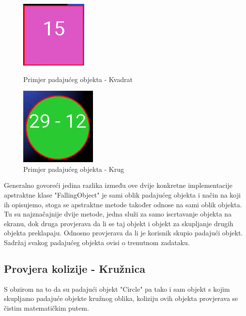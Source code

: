 \documentclass[times, utf8, zavrsni, numeric]{fer}
\begin{document}
	
		\begin{figure}[!htb]
			\begin{minipage}{0.48\textwidth}
				\centering
				\includegraphics[scale=0.6]{"slike/square.png"} 
				\caption{Primjer padajućeg objekta - Kvadrat}
				\label{fig:squre}
			\end{minipage}\hfill
			\begin{minipage}{0.48\textwidth}
				\centering
				\includegraphics[scale=0.6]{"slike/circle.png"} 
				\caption{Primjer padajućeg objekta - Krug}
				\label{fig:circle}
			\end{minipage}
		\end{figure}
		
		Generalno govoreći jedina razlika između ove dvije konkretne implementacije apstraktne klase "FallingObject" je sami oblik padajućeg objekta i način na koji ih opisujemo, stoga se apstraktne metode također odnose na sami oblik objekta.
		Tu su najznačajnije  dvije metode, jedna služi za samo iscrtavanje objekta na ekranu, dok druga provjerava da li se taj objekt i objekt za skupljanje drugih objekta preklapaju. Odnosno provjerava da li je korisnik skupio padajući objekt.
		Sadržaj svakog padajućeg objekta ovisi o trenutnom zadataku. 
		
	\subsection{Provjera kolizije - Kružnica}
	S obzirom na to da su padajući objekt "Circle" pa tako i sam objekt s kojim skupljamo padajuće objekte kružnog oblika, koliziju ovih objekta provjerava se čistim matematičkim putem. 
	
\end{document}
